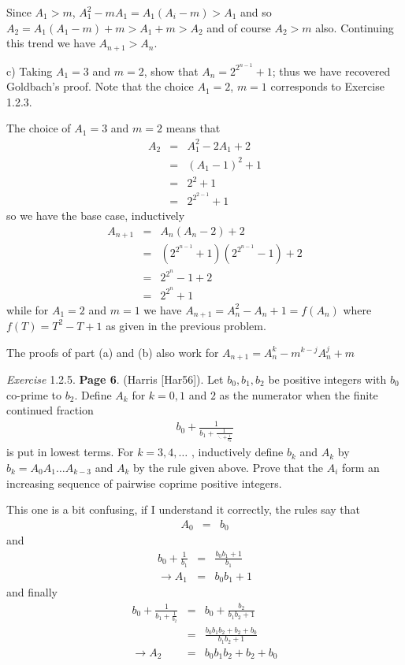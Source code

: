 \documentclass[aps,preprint,preprintnumbers,nofootinbib,showpacs,prd]{revtex4-1}
\newcommand{\nbea}{\begin{eqnarray*}}
\newcommand{\neea}{\end{eqnarray*}}
\begin{document}
Since $A_1 > m$, $A_1^2 - mA_1 = A_1(A_i - m) > A_1$ and so $A_2 = A_1(A_1-m) + m > A_1 + m > A_2$ and of course $A_2 > m$ also. Continuing this trend we have $A_{n+1} > A_n$.



c) Taking $A_1 = 3$ and $m = 2$, show that $A_n = 2^{2^{n-1}} + 1$; thus we have recovered Goldbach’s proof. Note that the choice $A_1 = 2$, $m = 1$ corresponds to Exercise 1.2.3.

The choice of $A_1=3$ and $m=2$ means that
%
\nbea
A_{2} & = & A_1^2 - 2A_1 + 2 \\
& = & (A_1 - 1)^2 + 1 \\
& = & 2^2 + 1 \\
& = & 2^{2^{2-1}} + 1
\neea
%
so we have the base case, inductively
%
\nbea
A_{n+1} & = & A_n(A_n - 2) + 2 \\
& = & (2^{2^{n-1}} + 1)(2^{2^{n-1}} - 1) + 2 \\
& = & 2^{2^n} - 1 + 2 \\
& = & 2^{2^n} + 1
\neea
%
while for $A_1=2$ and $m=1$ we have $A_{n+1} = A^2_n - A_n + 1 = f(A_n)$ where $f(T) = T^2 - T + 1$ as given in the previous problem.

The proofs of part (a) and (b) also work for $A_{n+1} = A^k_{n} - m^{k-j}A_n^j + m$

{\it Exercise} 1.2.5. {\bf Page 6}. (Harris [Har56]). Let $b_0 , b_1 , b_2$ be positive integers with $b_0$ co-prime to $b_2$. Define $A_k$ for $k = 0, 1$ and $2$ as the numerator when the finite continued fraction
%
\nbea
b_0 + \frac{1}{b_1 + \frac{1}{\ddots + \frac{1}{b_k}}}
\neea
%
is put in lowest terms. For $k = 3, 4, \dots$ , inductively define $b_k$ and $A_k$ by $b_k = A_0 A_1 \dots A_{k - 3}$ and $A_k$ by the rule given above. Prove that the $A_i$ form an increasing sequence of pairwise coprime positive integers.

This one is a bit confusing, if I understand it correctly, the rules say that
%
\nbea
A_0 & = & b_0 
\neea
%
and
%
\nbea
b_0 + \frac{1}{b_1} & = & \frac{b_0b_1 + 1}{b_1} \\
\to A_1 & = & b_0b_1 + 1
\neea
%
and finally
%
\nbea
b_0 + \frac{1}{b_1 + \frac{1}{b_2}} & = & b_0 + \frac{b_2}{b_1b_2 + 1} \\
& = & \frac{b_0b_1b_2 + b_2 + b_0}{b_1b_2 + 1} \\
\to A_2 & = & b_0b_1b_2 + b_2 + b_0
\neea
%
\end{document}
